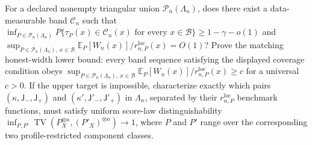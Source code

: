 For a declared nonempty triangular union \(\mathcal P_n(\Lambda_n)\), does there exist a data-measurable band \(\mathcal C_n\) such that \(\inf_{P\in\mathcal P_n(\Lambda_n)}P\{\tau_P(x)\in\mathcal C_n(x)\text{ for every }x\in\mathcal B\}\ge1-\gamma-o(1)\) and \(\sup_{P\in\mathcal P_n(\Lambda_n),\ x\in\mathcal B}\mathbb E_P[W_n(x)]/r_{n,P}^{\mathrm{loc}}(x)=O(1)\)? Prove the matching honest-width lower bound: every band sequence satisfying the displayed coverage condition obeys \(\sup_{P\in\mathcal P_n(\Lambda_n),\ x\in\mathcal B}\mathbb E_P[W_n(x)]/r_{n,P}^{\mathrm{loc}}(x)\ge c\) for a universal \(c>0\). If the upper target is impossible, characterize exactly which pairs \((\kappa,\mathsf J_{-},\mathsf J_{+})\) and \((\kappa',\mathsf J'_{-},\mathsf J'_{+})\) in \(\Lambda_n\), separated by their \(r_{n,P}^{\mathrm{loc}}\) benchmark functions, must satisfy uniform score-law distinguishability \(\inf_{P,P'}\operatorname{TV}(P_X^{\otimes n},(P'_X)^{\otimes n})\to1\), where \(P\) and \(P'\) range over the corresponding two profile-restricted component classes.